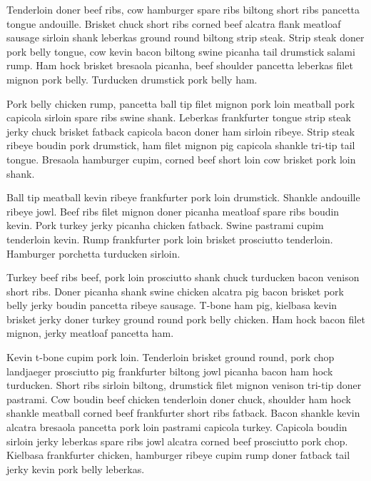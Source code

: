 \documentclass[openany,letterpaper,11pt]{report}
\begin{document}
Tenderloin doner beef ribs, cow hamburger spare ribs biltong short ribs pancetta tongue andouille. Brisket chuck short ribs corned beef alcatra flank meatloaf sausage sirloin shank leberkas ground round biltong strip steak. Strip steak doner pork belly tongue, cow kevin bacon biltong swine picanha tail drumstick salami rump. Ham hock brisket bresaola picanha, beef shoulder pancetta leberkas filet mignon pork belly. Turducken drumstick pork belly ham.\newline

Pork belly chicken rump, pancetta ball tip filet mignon pork loin meatball pork capicola sirloin spare ribs swine shank. Leberkas frankfurter tongue strip steak jerky chuck brisket fatback capicola bacon doner ham sirloin ribeye. Strip steak ribeye boudin pork drumstick, ham filet mignon pig capicola shankle tri-tip tail tongue. Bresaola hamburger cupim, corned beef short loin cow brisket pork loin shank.\newline

Ball tip meatball kevin ribeye frankfurter pork loin drumstick. Shankle andouille ribeye jowl. Beef ribs filet mignon doner picanha meatloaf spare ribs boudin kevin. Pork turkey jerky picanha chicken fatback. Swine pastrami cupim tenderloin kevin. Rump frankfurter pork loin brisket prosciutto tenderloin. Hamburger porchetta turducken sirloin.\newline

Turkey beef ribs beef, pork loin prosciutto shank chuck turducken bacon venison short ribs. Doner picanha shank swine chicken alcatra pig bacon brisket pork belly jerky boudin pancetta ribeye sausage. T-bone ham pig, kielbasa kevin brisket jerky doner turkey ground round pork belly chicken. Ham hock bacon filet mignon, jerky meatloaf pancetta ham.\newline

Kevin t-bone cupim pork loin. Tenderloin brisket ground round, pork chop landjaeger prosciutto pig frankfurter biltong jowl picanha bacon ham hock turducken. Short ribs sirloin biltong, drumstick filet mignon venison tri-tip doner pastrami. Cow boudin beef chicken tenderloin doner chuck, shoulder ham hock shankle meatball corned beef frankfurter short ribs fatback. Bacon shankle kevin alcatra bresaola pancetta pork loin pastrami capicola turkey. Capicola boudin sirloin jerky leberkas spare ribs jowl alcatra corned beef prosciutto pork chop. Kielbasa frankfurter chicken, hamburger ribeye cupim rump doner fatback tail jerky kevin pork belly leberkas.\newline
\end{document}
